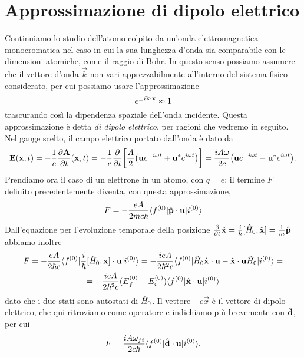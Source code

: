 \section{Approssimazione di dipolo elettrico}
Continuiamo lo studio dell'atomo colpito da un'onda elettromagnetica monocromatica nel caso in cui la sua lunghezza d'onda sia comparabile con le dimensioni atomiche, come il raggio di Bohr.
In questo senso possiamo assumere che il vettore d'onda $\vec k$ non vari apprezzabilmente all'interno del sistema fisico considerato, per cui possiamo usare l'approssimazione
\begin{equation}
	e^{\pm i{\mathbf{k}}\cdot{\mathbf{x}}}\approx 1
\end{equation}
trascurando cos\`i la dipendenza spaziale dell'onda incidente.
Questa approssimazione è detta \emph{di dipolo elettrico}, per ragioni che vedremo in seguito.
Nel gauge scelto, il campo elettrico portato dall'onda è dato da
\begin{equation}
	\mathbf{E}(\mathbf{x},t)=-\frac1{c}\frac{\partial {\mathbf{A}}}{\partial {t}}(\mathbf{x},t)=-\frac1{c}\frac{\partial {}}{\partial {t}}\bigg[\frac{A}2\big(\mathbf{u}e^{-i\omega t}+\mathbf{u}^*e^{i\omega t}\big)\bigg]=
	\frac{iA\omega}{2c}\big(\mathbf{u}e^{-i\omega t}-\mathbf{u}^*e^{i\omega t}\big).
	\label{eq:campo-elettrico-approssimazione-dipolo}
\end{equation}
Prendiamo ora il caso di un elettrone in un atomo, con $q=e$: il termine $F$ definito precedentemente diventa, con questa approssimazione,
\begin{equation}
	F=-\frac{eA}{2mc\hbar}\langle f^{(0)}\rvert{\hat{\mathbf{p}}}\cdot{\mathbf{u}}\lvert i^{(0)}\rangle
\end{equation}
Dall'equazione per l'evoluzione temporale della posizione $\frac{\partial {}}{\partial {t}}\hat{\mathbf{x}}=\frac{i}{\hbar}[\hat{H}_0,\hat{\mathbf{x}}]=\frac1{m}\hat{\mathbf{p}}$ abbiamo inoltre
\begin{multline}
	F=-\frac{eA}{2\hbar c}\langle f^{(0)}\rvert\frac{i}{\hbar}{[\hat{H}_0,\mathbf{x}]}\cdot{\mathbf{u}}\lvert i^{(0)}\rangle=
	-\frac{ieA}{2\hbar^2c}\langle f^{(0)}\rvert\hat{H}_0{\hat{\mathbf{x}}}\cdot{\mathbf{u}}-{\hat{\mathbf{x}}}\cdot{\mathbf{u}}\hat{H}_0\lvert i^{(0)}\rangle=\\=
	-\frac{ieA}{2\hbar^2c}(E_f^{(0)}-E_i^{(0)})\langle f^{(0)}\rvert{\hat{\mathbf{x}}}\cdot{\mathbf{u}}\lvert i^{(0)}\rangle
\end{multline}
dato che i due stati sono autostati di $\hat{H}_0$.
Il vettore $-e\vec x$ è il vettore di dipolo elettrico, che qui ritroviamo come operatore e indichiamo più brevemente con $\hat{\mathbf{d}}$, per cui
\begin{equation}
	F=\frac{iA\omega_{fi}}{2c\hbar}\langle f^{(0)}\rvert{\hat{\mathbf{d}}}\cdot{\mathbf{u}}\lvert i^{(0)}\rangle.
\end{equation}


